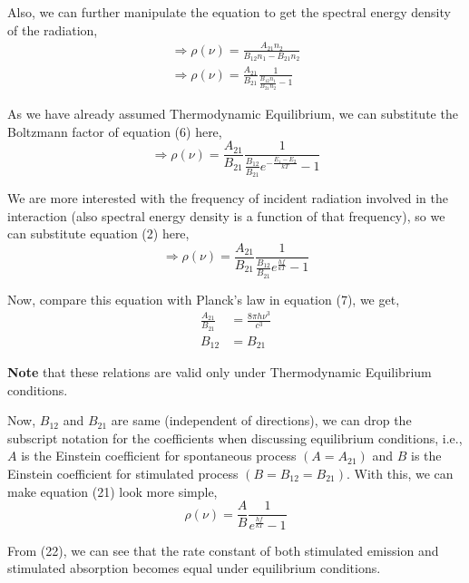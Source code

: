 \documentclass[12pt]{article}
\begin{document}
Also, we can further manipulate the equation to get the spectral energy density of the radiation,
\begin{align*}
    \Rightarrow \rho(\nu) = \frac{A_{21}n_{2}}{B_{12}n_{1} - B_{21}n_{2}} \\
    \Rightarrow \rho(\nu) = \frac{A_{21}}{B_{21}} \frac{1}{\frac{B_{12}n_{1}}{B_{21}n_{2}} - 1}
\end{align*}

As we have already assumed Thermodynamic Equilibrium, we can substitute the Boltzmann factor of equation (6) here,
\begin{equation*}
    \Rightarrow \rho(\nu) = \frac{A_{21}}{B_{21}} \frac{1}{\frac{B_{12}}{B_{21}} e^{-\frac{E_{1} - E_{2}}{kT}} - 1}
\end{equation*} \vspace{.2cm}

We are more interested with the frequency of incident radiation involved in the interaction (also spectral energy density is a function of that frequency), so we can substitute equation (2) here,
\begin{equation}
    \Rightarrow \rho(\nu) = \frac{A_{21}}{B_{21}} \frac{1}{\frac{B_{12}}{B_{21}} e^{\frac{hf}{kT}} - 1}
\end{equation}

Now, compare this equation with Planck's law in equation (7), we get,
\begin{align}
    \frac{A_{21}}{B_{21}} & = \frac{8\pi h \nu^3}{c^3} \\
    B_{12} & = B_{21}
\end{align}

\textbf{Note} that these relations are valid only under Thermodynamic Equilibrium conditions. \vspace{.2cm}

Now, $B_{12}$ and $B_{21}$ are same (independent of directions), we can drop the subscript notation for the coefficients when discussing equilibrium conditions, i.e., $A$ is the Einstein coefficient for spontaneous process $(A = A_{21})$ and $B$ is the Einstein coefficient for stimulated process $(B = B_{12} = B_{21})$. With this, we can make equation (21) look more simple,
\begin{equation*}
    \rho(\nu) = \frac{A}{B} \frac{1}{e^{\frac{hf}{kT}} - 1}
\end{equation*} 

From (22), we can see that the rate constant of both stimulated emission and stimulated absorption becomes equal under equilibrium conditions. \vspace{.2cm} 
\end{document}
